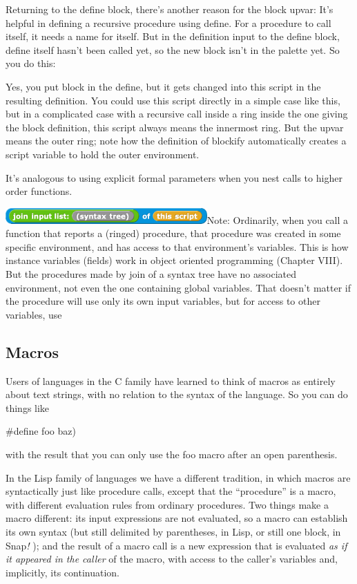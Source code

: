 Returning to the define block, there's another reason for the block
upvar: It's helpful in defining a recursive procedure using define. For
a procedure to call itself, it needs a name for itself. But in the
definition input to the define block, define itself hasn't been called
yet, so the new block isn't in the palette yet. So you do this:

Yes, you put block in the define, but it gets changed into this script
in the resulting definition. You could use this script directly in a
simple case like this, but in a complicated case with a recursive call
inside a ring inside the one giving the block definition, this script
always means the innermost ring. But the upvar means the outer ring;
note how the definition of blockify automatically creates a script
variable to hold the outer environment.

It's analogous to using explicit formal parameters when you nest calls
to higher order functions.

\includegraphics[width=3.03958in,height=0.23958in]{media/image992.png}Note:
Ordinarily, when you call a function that reports a (ringed) procedure,
that procedure was created in some specific environment, and has access
to that environment's variables. This is how instance variables (fields)
work in object oriented programming (Chapter VIII). But the procedures
made by join of a syntax tree have no associated environment, not even
the one containing global variables. That doesn't matter if the
procedure will use only its own input variables, but for access to other
variables, use

\subsection{Macros}\label{macros}

Users of languages in the C family have learned to think of macros as
entirely about text strings, with no relation to the syntax of the
language. So you can do things like

\#define foo baz)

with the result that you can only use the foo macro after an open
parenthesis.

In the Lisp family of languages we have a different tradition, in which
macros are syntactically just like procedure calls, except that the
``procedure'' is a macro, with different evaluation rules from ordinary
procedures. Two things make a macro different: its input expressions are
not evaluated, so a macro can establish its own syntax (but still
delimited by parentheses, in Lisp, or still one block, in Snap\emph{!}
); and the result of a macro call is a new expression that is evaluated
\emph{as if it appeared in the caller} of the macro, with access to the
caller's variables and, implicitly, its continuation.

